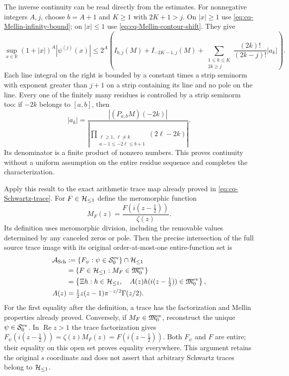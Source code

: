The inverse continuity can be read directly from the estimates.
For nonnegative integers $A,j$, choose $b=A+1$ and $K\geq1$
with $2K+1>j$. On $|x|\geq1$ use
\eqref{eq:cq-Mellin-infinity-bound}; on $|x|\leq1$ use
\eqref{eq:cq-Mellin-contour-shift}. They give
\begin{equation}\label{eq:cq-Mellin-inverse-seminorm}
 \sup_{x\in\mathbb R}(1+|x|)^A|\psi^{(j)}(x)|
 \leq2^A\left(
 I_{b,j}(M)+I_{-2K-1,j}(M)
 +\sum_{\substack{1\leq k\leq K\\2k\geq j}}
           \frac{(2k)!}{(2k-j)!}|a_k|\right).
\end{equation}
Each line integral on the right is bounded by a constant times
a strip seminorm with exponent greater than $j+1$ on a strip
containing its line and no pole on the line. Every one of the
finitely many residues is controlled by a strip seminorm too:
if $-2k$ belongs to $[a,b]$, then
\[
 |a_k|=
 \frac{|(P_{a,b}M)(-2k)|}
 {\left|\displaystyle\prod_{\substack{\ell\geq1,\ \ell\ne k\\
                         a-1\leq-2\ell\leq b+1}}(2\ell-2k)\right|}.
\]
Its denominator is a finite product of nonzero numbers. This
proves continuity without a uniform assumption on the entire
residue sequence and completes the characterization.

Apply this result to the exact arithmetic trace map already proved
in \eqref{eq:cq-Schwartz-trace}. For $F\in\mathcal H_{\leq 1}$ define the
meromorphic function
\[
 M_F(z)=\frac{F(i(z-\tfrac12))}{\zeta(z)}.
\]
Its definition uses meromorphic division, including the removable
values determined by any canceled zeros or pole. Then the precise
intersection of the full source trace image with its original
order-at-most-one entire-function set is
\begin{equation}\label{eq:cq-exact-Schwartz-trace-image}
 \begin{aligned}
 \mathcal A_{\rm Sch}
 &:=\{F_\psi:\psi\in\mathcal S_0^{\rm ev}\}\cap\mathcal H_{\leq 1}\\
 &=\{F\in\mathcal H_{\leq 1}:M_F\in\mathfrak M_0^{\rm ev}\}\\
 &=\left\{\Xi h:h\in\mathcal H_{\leq 1},\quad
     A(z)h(i(z-\tfrac12))\in\mathfrak M_0^{\rm ev}\right\},\\
 A(z)&=\tfrac12z(z-1)\pi^{-z/2}\Gamma(z/2).
 \end{aligned}
\end{equation}
For the first equality after the definition, a trace has the
factorization and Mellin properties already proved. Conversely,
if $M_F\in\mathfrak M_0^{\rm ev}$, reconstruct the unique
$\psi\in\mathcal S_0^{\rm ev}$. In $\operatorname{Re}z>1$
the trace factorization gives
$F_\psi(i(z-\tfrac12))=\zeta(z)M_F(z)
=F(i(z-\tfrac12))$. Both $F_\psi$ and $F$ are entire;
their equality on this open set proves equality everywhere.
This argument retains the original $s$ coordinate and does not
assert that arbitrary Schwartz traces belong to $\mathcal H_{\leq 1}$.

